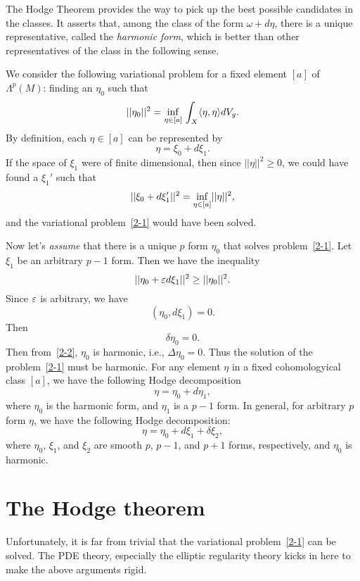 The Hodge Theorem provides the way to pick up the best possible candidates in the classes. It asserts that, among the class of the form
$\omega+d\eta$, there is a unique representative, called
the {\it harmonic form}, which is better than other representatives of the class in the
following sense.




We consider the following variational problem for a fixed
element $[a]$ of $\Lambda^p(M)$: finding an $\eta_0$ such
that
\begin{equation}\label{2-1}
||\eta_0||^2
=\underset{\eta\in[a]}{\rm inf}\,\int_X\langle\eta,\eta\rangle dV_g.
\end{equation}
By definition,
each $\eta\in [a]$ can be represented  by
\[
\eta=\xi_0+d\xi_1.
\]
If the space of $\xi_1$ were of finite dimensional, then since
$||\eta||^2\geq 0$, we could have found a $\xi_1'$
such that
\[
||\xi_0+d\xi_1'||^2=\underset{\eta\in[a]}{\rm inf}
||\eta||^2,
\]
and the variational problem~\eqref{2-1} would have been solved.

Now let's {\it assume}
that there is a unique $p$  form $\eta_0$
that solves  problem~\eqref{2-1}. Let $\xi_1$ be an arbitrary
$p-1$ form.  Then we have the
inequality
\[
||\eta_0+\varepsilon d\xi_1||^2\geq||\eta_0||^2.
\]
Since $\varepsilon$ is arbitrary, we have
\[
(\eta_0,d\xi_1)=0.
\]
Then
\begin{equation}\label{2-2}
\delta\eta_0=0.
\end{equation}
Then from~\eqref{2-2}, $\eta_0$ is harmonic, i.e.,
$\Delta\eta_0=0
$. Thus the solution of the problem~\eqref{2-1} must be
harmonic.
 For any element $\eta$
in a fixed cohomologyical class $[a]$, we have the following
Hodge decomposition
\[
\eta=\eta_0+d \eta_1,
\]
where $\eta_0$ is the harmonic form, and $\eta_1$ is a $p-1$ form.
In general, for arbitrary $p$ form $\eta$, we have the following Hodge
decomposition:
\[
\eta=\eta_0+d\xi_1+\delta\xi_2,
\]
where $\eta_0$, $\xi_1$, and $\xi_2$ are smooth 
$p$, $p-1$, and $p+1$ forms, respectively,
and $\eta_0$ is harmonic. 

\section{The Hodge theorem}\label{State_Hodge}
Unfortunately, it is far from trivial that the variational
problem~\eqref{2-1} can be solved. The PDE theory, especially
the elliptic regularity theory kicks in here to make the above
arguments  rigid. 




